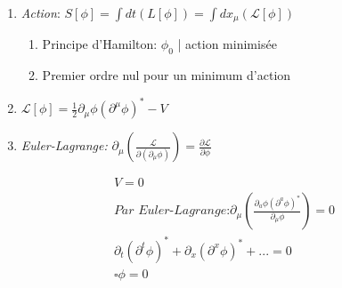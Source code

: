 \documentclass[handout]{beamer}
\begin{document}
\begin{frame}
\begin{enumerate}
\item \textit{Action}: $S[\phi] = \int{dt (L[\phi])}  =  \int{dx_\mu (\mathcal{L}[\phi])}$
\begin{enumerate}
\item Principe d'Hamilton: $\phi_0$ | action minimisée \\
\item Premier ordre nul pour un minimum d'action \\
\end{enumerate}
\item  $\mathcal{L}[\phi] = \frac{1}{2} \partial_\mu \phi (\partial^\mu \phi)^* -V$
\item \textit{Euler-Lagrange:} $\partial_\mu \left(\frac{\mathcal{L}}{\partial(\partial_\mu\phi)}\right) = \frac{\partial\mathcal{L}}{\partial\phi}$
\end{enumerate}
\begin{align*}
 V=0 \\
 \textit{Par Euler-Lagrange:}
 \partial_\mu(\frac{\partial_a\phi (\partial^a\phi)^* }{\partial_\mu \phi}) = 0 \\
 \partial_t(\partial^{t} \phi )^{*} + \partial_x(\partial^{x} \phi )^{*} +... = 0 \\
 \square \phi = 0 \\
\end{align*}
\end{frame}
\end{document}
